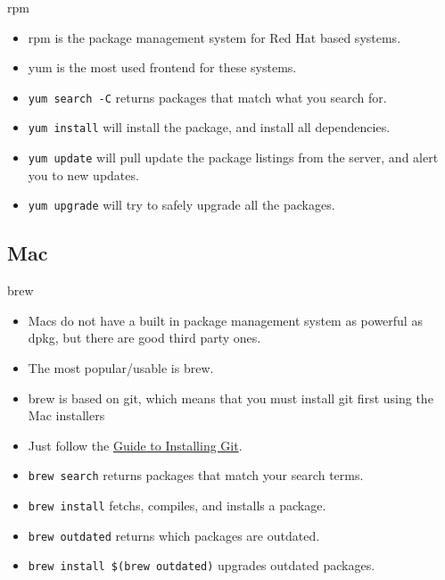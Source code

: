\documentclass[10pt]{beamer}
\begin{document}
\begin{frame}{rpm}
\begin{itemize}
\item rpm is the package management system for Red Hat based systems.
\item yum is the most used frontend for these systems.
\item \texttt{\color{blue}yum search -C} returns packages that match what you search for.
\item \texttt{\color{blue}yum install} will install the package, and install all dependencies.
\item \texttt{\color{blue}yum update} will pull update the package listings from the server, and alert you to new updates.
\item \texttt{\color{blue}yum upgrade} will try to safely upgrade all the packages.
\end{itemize}
\end{frame}

\subsection{Mac}
\begin{frame}{brew}
\begin{itemize}
\item Macs do not have a built in package management system as powerful as dpkg, but there are good third party ones.
\item The most popular/usable is brew.
\item brew is based on git, which means that you must install git first using the Mac installers
\item Just follow the \href{http://help.github.com/mac-git-installation/}{\color{blue}Guide to Installing Git}.
\item \texttt{\color{blue}brew search} returns packages that match your search terms.
\item \texttt{\color{blue}brew install} fetchs, compiles, and installs a package.
\item \texttt{\color{blue}brew outdated} returns which packages are outdated.
\item \texttt{\color{blue}brew install \$(brew outdated)} upgrades outdated packages.
\end{itemize}
\end{frame}
\end{document}
